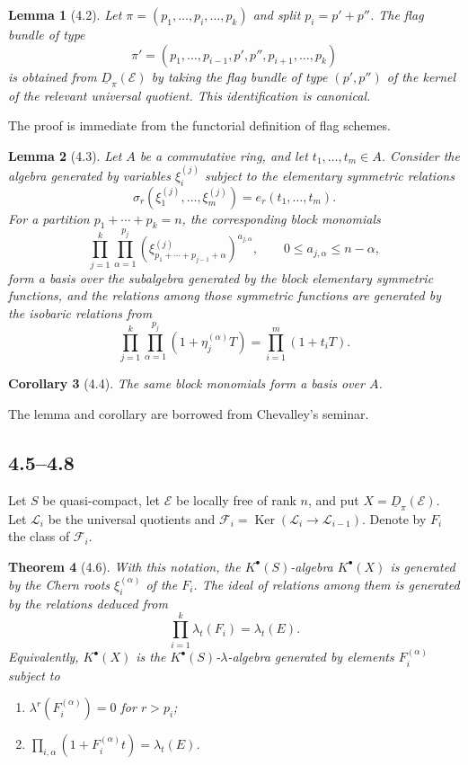 \documentclass[11pt]{article}
\theoremstyle{plain}
\newtheorem{theorem}{Theorem}[section]
\newtheorem{lemma}[theorem]{Lemma}
\newtheorem{corollary}[theorem]{Corollary}
\theoremstyle{definition}
\theoremstyle{remark}
\DeclareMathOperator{\Ker}{Ker}
\begin{document}
\begin{lemma}[4.2]
Let $\pi=(p_1,\ldots,p_i,\ldots,p_k)$ and split $p_i=p'+p''$. The flag bundle of type
\[
\pi'=(p_1,\ldots,p_{i-1},p',p'',p_{i+1},\ldots,p_k)
\]
is obtained from $\underline D_\pi(\mathcal E)$ by taking the flag bundle of type $(p',p'')$ of the kernel of the relevant universal quotient. This identification is canonical.
\end{lemma}
The proof is immediate from the functorial definition of flag schemes.

\begin{lemma}[4.3]
Let $A$ be a commutative ring, and let $t_1,\ldots,t_m\in A$. Consider the algebra generated by variables $\xi_i^{(j)}$ subject to the elementary symmetric relations
\[
\sigma_r(\xi_1^{(j)},\ldots,\xi_m^{(j)})=e_r(t_1,\ldots,t_m).
\]
For a partition $p_1+\cdots+p_k=n$, the corresponding block monomials
\[
\prod_{j=1}^{k}\prod_{\alpha=1}^{p_j}(\xi_{p_1+\cdots+p_{j-1}+\alpha}^{(j)})^{a_{j,\alpha}},
\qquad
0\leq a_{j,\alpha}\leq n-\alpha,
\]
form a basis over the subalgebra generated by the block elementary symmetric functions, and the relations among those symmetric functions are generated by the isobaric relations from
\[
\prod_{j=1}^{k}\prod_{\alpha=1}^{p_j}(1+\eta_j^{(\alpha)}T)=\prod_{i=1}^{m}(1+t_iT).
\]
\end{lemma}

\begin{corollary}[4.4]
The same block monomials form a basis over $A$.
\end{corollary}
The lemma and corollary are borrowed from Chevalley's seminar.

\subsection*{4.5--4.8}
Let $S$ be quasi-compact, let $\mathcal E$ be locally free of rank $n$, and put $X=\underline D_\pi(\mathcal E)$. Let $\mathcal L_i$ be the universal quotients and $\mathcal F_i=\Ker(\mathcal L_i\to\mathcal L_{i-1})$. Denote by $F_i$ the class of $\mathcal F_i$.

\begin{theorem}[4.6]\label{thm:VI.4.6}
With this notation, the $K^{\bullet}(S)$-algebra $K^{\bullet}(X)$ is generated by the Chern roots $\xi_i^{(\alpha)}$ of the $F_i$. The ideal of relations among them is generated by the relations deduced from
\begin{equation}\label{eq:VI.4.6}
\prod_{i=1}^{k}\lambda_t(F_i)=\lambda_t(E).
\end{equation}
Equivalently, $K^{\bullet}(X)$ is the $K^{\bullet}(S)$-$\lambda$-algebra generated by elements $F_i^{(\alpha)}$ subject to
\begin{enumerate}[label=(\roman*)]
\item $\lambda^r(F_i^{(\alpha)})=0$ for $r>p_i$;
\item $\prod_{i,\alpha}(1+F_i^{(\alpha)}t)=\lambda_t(E)$.
\end{enumerate}
\end{theorem}
\end{document}
